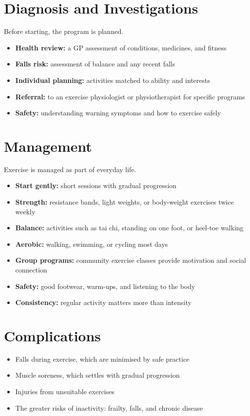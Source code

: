 \section*{Diagnosis and Investigations}
Before starting, the program is planned.
\begin{itemize}
    \item \textbf{Health review:} a GP assessment of conditions, medicines, and fitness
    \item \textbf{Falls risk:} assessment of balance and any recent falls
    \item \textbf{Individual planning:} activities matched to ability and interests
    \item \textbf{Referral:} to an exercise physiologist or physiotherapist for specific programs
    \item \textbf{Safety:} understanding warning symptoms and how to exercise safely
\end{itemize}

\section*{Management}
Exercise is managed as part of everyday life.
\begin{itemize}
    \item \textbf{Start gently:} short sessions with gradual progression
    \item \textbf{Strength:} resistance bands, light weights, or body-weight exercises twice weekly
    \item \textbf{Balance:} activities such as tai chi, standing on one foot, or heel-toe walking
    \item \textbf{Aerobic:} walking, swimming, or cycling most days
    \item \textbf{Group programs:} community exercise classes provide motivation and social connection
    \item \textbf{Safety:} good footwear, warm-ups, and listening to the body
    \item \textbf{Consistency:} regular activity matters more than intensity
\end{itemize}

\section*{Complications}
\begin{itemize}
    \item Falls during exercise, which are minimised by safe practice
    \item Muscle soreness, which settles with gradual progression
    \item Injuries from unsuitable exercises
    \item The greater risks of inactivity: frailty, falls, and chronic disease
\end{itemize}

